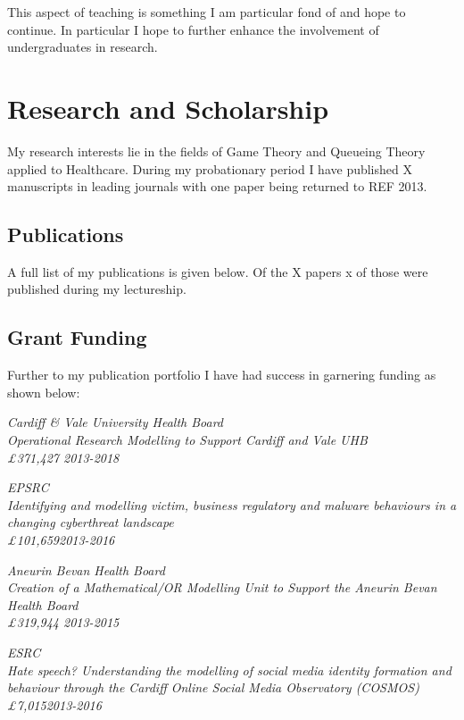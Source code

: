 \documentclass{article}
\begin{document}
This aspect of teaching is something I am particular fond of and hope to continue.
In particular I hope to further enhance the involvement of undergraduates in research.

\section{Research and Scholarship}\label{sec:research}

My research interests lie in the fields of Game Theory and Queueing Theory applied to Healthcare.
During my probationary period I have published X manuscripts in leading journals with one paper being returned to REF 2013.

\subsection{Publications}

A full list of my publications is given below. Of the X papers x of those were published during my lectureship.



\subsection{Grant Funding}

Further to my publication portfolio I have had success in garnering funding as shown below:

\sl{Cardiff \& Vale University Health Board}\\
Operational Research Modelling to Support Cardiff and Vale UHB\\
\pounds 371,427 \hfill{2013-2018}


\sl{EPSRC}\\
Identifying and modelling victim, business regulatory and malware behaviours in a changing cyberthreat landscape\\
\pounds101,659\hfill{2013-2016}


\sl{Aneurin Bevan Health Board}\\
Creation of a Mathematical/OR Modelling Unit to Support the Aneurin Bevan Health Board\\
\pounds319,944 \hfill{2013-2015}


\sl{ESRC}\\
Hate speech? Understanding the modelling of social media identity formation and behaviour through the Cardiff Online Social Media Observatory (COSMOS)\\
\pounds7,015\hfill{2013-2016}
\end{document}
